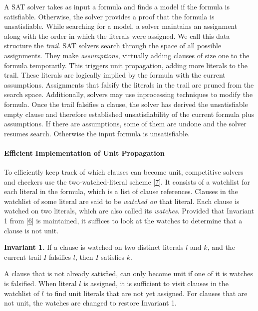 \documentclass[
]{report}
\begin{document}
A SAT solver takes as input a formula and finds a model if the formula
is satisfiable. Otherwise, the solver provides a proof that the formula
is unsatisfiable. While searching for a model, a solver maintains an
assignment along with the order in which the literals were assigned. We
call this data structure the \emph{trail}. SAT solvers search through
the space of all possible assignments. They make \emph{assumptions},
virtually adding clauses of size one to the formula temporarily. This
triggers unit propagation, adding more literals to the trail. These
literals are logically implied by the formula with the current
assumptions. Assignments that falsify the literals in the trail are
pruned from the search space. Additionally, solvers may use inprocessing
techniques to modify the formula. Once the trail falsifies a clause, the
solver has derived the unsatisfiable empty clause and therefore
established unsatisfiability of the current formula plus assumptions. If
there are assumptions, some of them are undone and the solver resumes
search. Otherwise the input formula is unsatisfiable.

\paragraph{Efficient Implementation of Unit Propagation}

To efficiently keep track of which clauses can become unit, competitive
solvers and checkers use the two-watched-literal scheme
{[}\protect\hyperlink{ref-Moskewicz:2001:CEE:378239.379017}{7}{]}. It
consists of a watchlist for each literal in the formula, which is a list
of clause references. Clauses in the watchlist of some literal are said
to be \emph{watched on} that literal. Each clause is watched on two
literals, which are also called its \emph{watches}. Provided that
Invariant 1 from {[}\protect\hyperlink{ref-RebolaCruz2018}{6}{]} is
maintained, it suffices to look at the watches to determine that a
clause is not unit.

\textbf{Invariant 1.} If a clause is watched on two distinct literals
\(l\) and \(k\), and the current trail \(I\) falsifies \(l\), then \(I\)
satisfies \(k\).

A clause that is not already satisfied, can only become unit if one of
it is watches is falsified. When literal \(l\) is assigned, it is
sufficient to visit clauses in the watchlist of \(\overline{l}\) to find
unit literals that are not yet assigned. For clauses that are not unit,
the watches are changed to restore Invariant 1.
\end{document}
